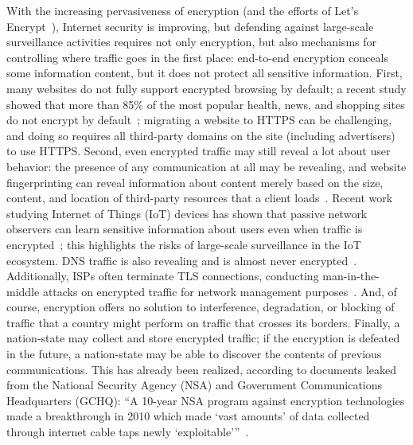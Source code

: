 With the increasing pervasiveness of encryption (and the efforts of Let's Encrypt~\cite{aas2014let}), 
Internet security is improving, but defending against large-scale surveillance activities requires not only encryption, but
also mechanisms for controlling where traffic goes in the first place:
end-to-end 
encryption conceals some information content, but it does not protect
all sensitive information.  First, many websites do not fully support
encrypted browsing by default; a recent study showed that more than 85\% of
the most popular health, news, and shopping sites do not encrypt by
default~\cite{what_isps_can_see}; migrating a website to HTTPS can be challenging,
and doing so requires all third-party domains on the site (including
advertisers) to use HTTPS.  Second, even encrypted traffic may still reveal a
lot about user behavior: the presence of any communication at all may be
revealing, and website fingerprinting can reveal information about content
merely based on the size, content, and location of third-party resources that
a client loads~\cite{Johnson2013a}. Recent work studying Internet of Things (IoT) devices 
has shown that passive network observers can learn sensitive information about users 
even when traffic is encrypted~\cite{apthorpe2016poster}; this highlights the risks of large-scale surveillance 
in the IoT ecosystem. DNS traffic is also revealing and is
almost never encrypted~\cite{what_isps_can_see}.  Additionally, ISPs often
terminate TLS connections, conducting man-in-the-middle attacks on encrypted
traffic for network management purposes~\cite{mitm_isp}.  And, of course,
encryption offers no solution to interference, degradation, or blocking of
traffic that a country might perform on traffic that crosses its borders.
Finally, a nation-state may collect and store encrypted traffic; if the
encryption is defeated in the future, a nation-state may be able to discover the
contents of previous communications.  This has already been realized, according to 
documents leaked from the National Security Agency (NSA) and Government Communications 
Headquarters (GCHQ): ``A 10-year NSA program against encryption technologies made a breakthrough in 2010 which made `vast amounts' of data collected through internet cable taps newly `exploitable'''~\cite{encryption_forward}.


